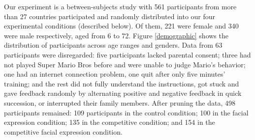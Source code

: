 \documentclass[10pt,journal,compsoc]{IEEEtran}
\begin{document}
Our experiment is a between-subjects study with 561 participants from more than 27 countries participated and %
randomly distributed into our four experimental conditions (described below). %
Of them, 221 were female and 340 were male respectively, aged from 6 to 72. Figure \ref{demographic} %
shows the distribution of participants across age ranges and genders. %
Data from 63 participants were disregarded: five participants lacked parental consent; three had not played Super Mario Bros before and were unable to judge Mario's behavior; one had an internet connection problem, one quit after only five minutes' training; and the rest did not fully understand the instructions, got stuck and gave feedback randomly by alternating positive and negative feedback in quick succession, or interrupted their family members. %
After pruning the data, 498 participants remained: 109 participants in the control condition; 100 in the facial expression condition; 135 in the competitive condition; and 154 in the competitive facial expression condition.
\end{document}
